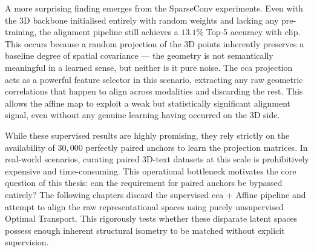 A more surprising finding emerges from the SparseConv experiments. Even with the 3D backbone initialised entirely with random weights and lacking any pre-training, the alignment pipeline still achieves a $13.1\%$ Top-5 accuracy with \gls{clip}. This occurs because a random projection of the 3D points inherently preserves a baseline degree of spatial covariance --- the geometry is not semantically meaningful in a learned sense, but neither is it pure noise. The \gls{cca} projection acts as a powerful feature selector in this scenario, extracting any raw geometric correlations that happen to align across modalities and discarding the rest. This allows the affine map to exploit a weak but statistically significant alignment signal, even without any genuine learning having occurred on the 3D side.

While these supervised results are highly promising, they rely strictly on the availability of $30{,}000$ perfectly paired anchors to learn the projection matrices. In real-world scenarios, curating paired 3D-text datasets at this scale is prohibitively expensive and time-consuming. This operational bottleneck motivates the core question of this thesis: can the requirement for paired anchors be bypassed entirely? The following chapters discard the supervised \gls{cca} + Affine pipeline and attempt to align the raw representational spaces using purely unsupervised Optimal Transport. This rigorously tests whether these disparate latent spaces possess enough inherent structural isometry to be matched without explicit supervision.